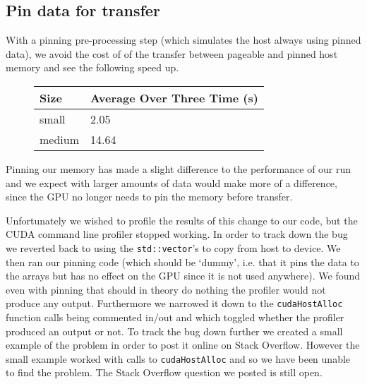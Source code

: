 \subsection*{Pin data for transfer}
With a pinning pre-processing step (which simulates the host always using pinned data), we avoid the cost of of the transfer between pageable and pinned host memory and see the following speed up.
\begin{figure}[H]\centering \begin{tabular}{ l | l }
  \hline
  Size & Average Over Three Time (s) \\
  \hline
  \hline
  small & 2.05 \\
  medium & 14.64 \\
  \hline
\end{tabular} \end{figure}

Pinning our memory has made a slight difference to the performance of our run and we expect with larger amounts of data would make more of a difference, since the GPU no longer needs to pin the memory before transfer.

Unfortunately we wished to profile the results of this change to our code, but the CUDA command line profiler stopped working. In order to track down the bug we reverted back to using the \verb!std::vector!'s to copy from host to device. We then ran our pinning code (which should be `dummy', i.e. that it pins the data to the arrays but has no effect on the GPU since it is not used anywhere). We found even with pinning that should in theory do nothing the profiler would not produce any output. Furthermore we narrowed it down to the \verb!cudaHostAlloc! function calls being commented in/out and which toggled whether the profiler produced an output or not.
To track the bug down further we created a small example of the problem in order to post it online on Stack Overflow. However the small example worked with calls to \verb!cudaHostAlloc! and so we have been unable to find the problem. The Stack Overflow question we posted is still open.\cite{so_profiler}